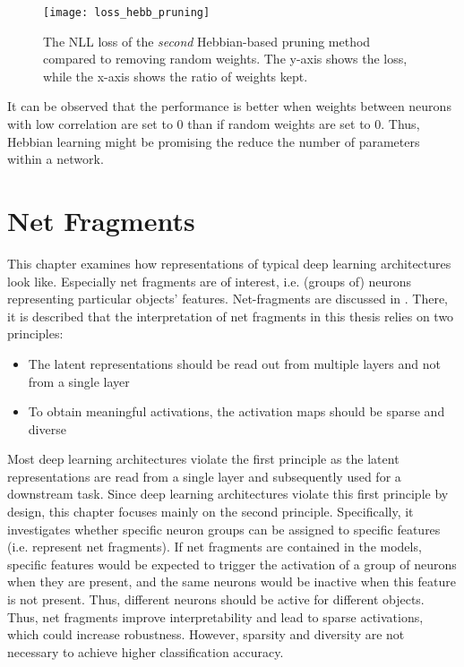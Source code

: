 \begin{figure}[h]
    \centering
    \texttt{[image: loss\_hebb\_pruning]}
    \caption[NLL Loss of Hebbian Pruning]{The NLL loss of the \emph{second} Hebbian-based pruning method compared to removing random weights. The y-axis shows the loss, while the x-axis shows the ratio of weights kept. }
\end{figure}

It can be observed that the performance is better when weights between neurons with low correlation are set to \(0\) than if random weights are set to \(0\).
Thus, Hebbian learning might be promising the reduce the number of parameters within a network.


\pagebreak
\chapter{Net Fragments}
This chapter examines how representations of typical deep learning architectures look like.
Especially net fragments are of interest, i.e. (groups of) neurons representing particular objects' features.
Net-fragments are discussed in .
There, it is described that the interpretation of net fragments in this thesis relies on two principles:

\begin{itemize}
	\item The latent representations should be read out from multiple layers and not from a single layer
	\item To obtain meaningful activations, the activation maps should be sparse and diverse
\end{itemize}


Most deep learning architectures violate the first principle as the latent representations are read from a single layer and subsequently used for a downstream task.
Since deep learning architectures violate this first principle by design, this chapter focuses mainly on the second principle. Specifically, it investigates whether specific neuron groups can be assigned to specific features (i.e. represent net fragments). 
If net fragments are contained in the models, specific features would be expected to trigger the activation of a group of neurons when they are present, and the same neurons would be inactive when this feature is not present. Thus, different neurons should be active for different objects.
Thus, net fragments improve interpretability and lead to sparse activations, which could increase robustness.
However, sparsity and diversity are not necessary to achieve higher classification accuracy.

